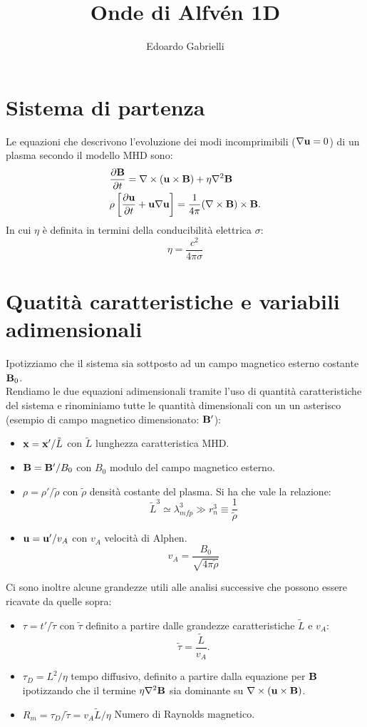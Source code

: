 
\title{Onde di Alfvén 1D}
\author{Edoardo Gabrielli}


\maketitle
\section{Sistema di partenza}
Le equazioni che descrivono l'evoluzione dei modi incomprimibili ($\nabla \vv{u} = 0$) di un plasma secondo il modello MHD sono:
\begin{align}
     & \pd{\vv{B}} = \nabla \times (\vv{u} \times \vv{B}) + \eta \nabla^2 \vv{B}                                   \\
     & \rho \left[\pd{\vv{u}} + \vv{u} \nabla \vv{u}\right] =\frac{1}{4\pi} (\nabla \times \vv{B} ) \times \vv{B}.
    \label{eq:moto}
\end{align}
In cui $\eta$ è definita in termini della conducibilità elettrica $\sigma$:
\[
    \eta = \frac{c^2}{4\pi\sigma}
\]
\section{Quatità caratteristiche e variabili adimensionali}
Ipotizziamo che il sistema sia sottposto ad un campo magnetico esterno costante $\vv{B}_0$.\\
Rendiamo le due equazioni adimensionali tramite l'uso di quantità caratteristiche del sistema e rinominiamo tutte le quantità dimensionali con un un asterisco (esempio di campo magnetico dimensionato: $\vv{B}'$):
\begin{itemize}
    \item $\vv{x} = \vv{x}'/\tilde{L}$ con $\tilde{L}$ lunghezza caratteristica MHD.
    \item $\vv{B} = \vv{B}'/B_0$ con $B_0$ modulo del campo magnetico esterno.
    \item $\rho = \rho'/\tilde{\rho}$ con $\tilde{\rho}$ densità costante del plasma. Si ha che vale la relazione:
          \[
              \tilde{L}^3 \simeq \lambda_{mfp}^3 \gg r_n^3 \equiv \frac{1}{\tilde{\rho }}
          \]
    \item $\vv{u} = \vv{u}'/v_A$ con $v_A$ velocità di Alphen.
          \[v_A = \frac{B_0}{\sqrt{4\pi \tilde{\rho}}}\]
\end{itemize}
Ci sono inoltre alcune grandezze utili alle analisi successive che possono essere ricavate da quelle sopra:
\begin{itemize}
    \item $\tau = t' /\tilde{\tau}$ con $\tilde{\tau}$ definito a partire dalle grandezze caratteristiche $\tilde{L}$ e $v_A$:
          \[\tilde{\tau} = \frac{\tilde{L}}{v_A}.\]
    \item $\tau_D = L^2 / \eta$ tempo diffusivo, definito a partire dalla equazione per $\vv{B}$ ipotizzando che il termine $\eta \nabla^2\vv{B}$ sia dominante su $\nabla \times (\vv{u} \times \vv{B})$.
    \item $R_m = \tau_D/\tilde{\tau} = v_A \tilde{L}/\eta$ Numero di Raynolds magnetico.
\end{itemize}
